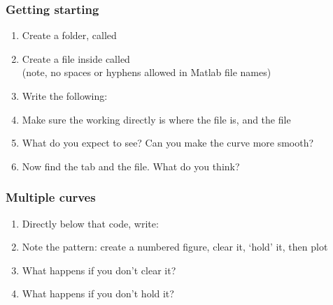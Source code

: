 \documentclass[9pt]{beamer-control}
\begin{document}
\begin{frame}
  \frametitle{Getting starting}
  \begin{enumerate}
    \item Create a folder, called 
    \item Create a file inside called \\(note, no spaces or hyphens allowed in Matlab file names)
    \item Write the following:
    \item Make sure the working directly is where the file is, and  the file
    \item What do you expect to see? Can you make the curve more smooth?
    \item Now find the  tab and  the file. What do you think?
  \end{enumerate}
\end{frame}
\begin{frame}

  \frametitle{Multiple curves}
  \begin{enumerate}
    \item Directly below that code, write:
    \item Note the pattern: create a numbered figure, clear it, `hold' it, then plot
    \item What happens if you don't clear it?
    \item What happens if you don't hold it?
  \end{enumerate}
\end{frame}

\end{document}
